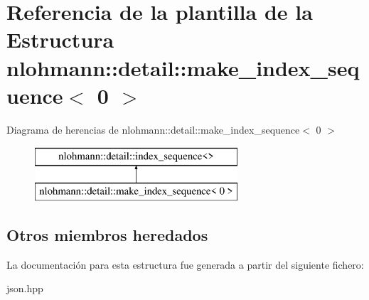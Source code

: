 \hypertarget{structnlohmann_1_1detail_1_1make__index__sequence_3_010_01_4}{}\section{Referencia de la plantilla de la Estructura nlohmann\+:\+:detail\+:\+:make\+\_\+index\+\_\+sequence$<$ 0 $>$}
\label{structnlohmann_1_1detail_1_1make__index__sequence_3_010_01_4}
Diagrama de herencias de nlohmann\+:\+:detail\+:\+:make\+\_\+index\+\_\+sequence$<$ 0 $>$\begin{figure}[H]
\begin{center}
\leavevmode
\includegraphics[height=2.000000cm]{structnlohmann_1_1detail_1_1make__index__sequence_3_010_01_4}
\end{center}
\end{figure}
\subsection*{Otros miembros heredados}


La documentación para esta estructura fue generada a partir del siguiente fichero\+:\begin{DoxyCompactItemize}
\item 
json.\+hpp\end{DoxyCompactItemize}
